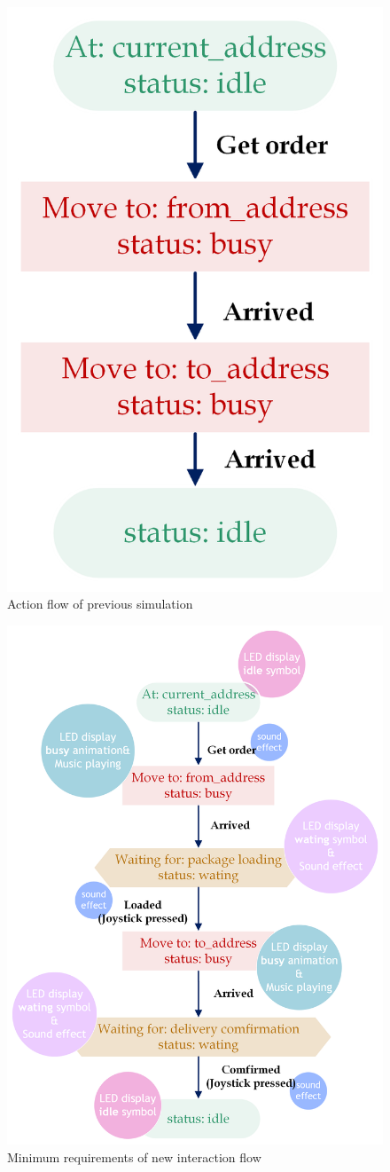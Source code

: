 \documentclass{article}
\begin{document}
\begin{figure}[h]
    \centering
    \includegraphics[width=0.4\linewidth]{old.png}
    \caption{Action flow of previous simulation}
    \label{fig:old}
\end{figure}

\begin{figure}[h]
    \centering
    \includegraphics[width=0.8\linewidth]{new.png}
    \caption{Minimum requirements of new interaction flow}
    \label{fig:new}
\end{figure}
\end{document}
